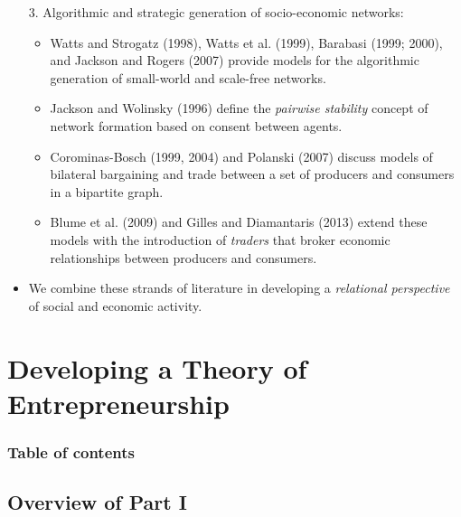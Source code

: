 \documentclass[10pt]{beamer}
\begin{document}
\begin{frame}
\begin{itemize}
\item[3.] Algorithmic and strategic generation of socio-economic networks:
\begin{itemize}
\medskip
\item Watts and Strogatz (1998), Watts et al. (1999), Barabasi (1999; 2000), and Jackson and Rogers (2007) provide models for the algorithmic generation of small-world and scale-free networks.
\medskip
\item Jackson and Wolinsky (1996) define the \emph{pairwise stability} concept of network formation based on consent between agents.
\medskip
\item Corominas-Bosch (1999, 2004) and Polanski (2007) discuss models of bilateral bargaining and trade between a set of producers and consumers in a bipartite graph.
\medskip
\item Blume et al. (2009) and Gilles and Diamantaris (2013) extend these models with the introduction of \emph{traders} that broker economic relationships between producers and consumers.
\end{itemize}
\medskip
\item We combine these strands of literature in developing a \emph{relational perspective} of social and economic activity.
\end{itemize}
\end{frame}

\section{Developing a Theory of Entrepreneurship}

\begin{frame}
\frametitle{Table of contents}
\tableofcontents[currentsection]
\end{frame}

\subsection{Overview of Part I}
\end{document}
